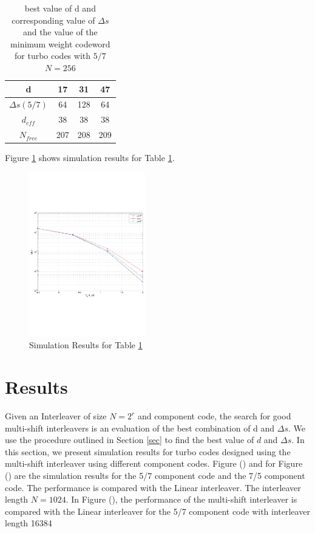 \documentclass[twocolumn]{article}
\begin{document}
 \begin{table}[h!]
\centering
\begin{tabular}{||c |c |c |c||} 
 \hline
 d & 17 & 31 & 47 \\ [0.5ex] 
 \hline\hline
 $\Delta s(5/7)$ & 64 & 128 & 64 \\ 
 \hline
  $d_{eff}$ & 38 & 38 & 38 \\ 
  \hline
  $N_{free}$ & 207 & 208 & 209 \\ [1ex] 
 \hline
\end{tabular}
\caption{best value of d and corresponding value of $\Delta s$ 
and the value of the minimum weight codeword for
 turbo codes with $5/7$ $N=256$}
\label{tab1}
\end{table}

 Figure \ref{comp1} shows simulation results for Table 
 \ref{tab1}.
\begin{figure}[h!]
\centering
		\includegraphics[height = 10 cm,width=0.45\textwidth]{myInterleaver_(comparison_256)_5_7_2.pdf}
		\caption{Simulation Results for Table \ref{tab1}}
		\label{comp1}
		\end{figure}
		
\section{Results}
Given an Interleaver of size $N=2^r$ and component code, the search for good
multi-shift interleavers is an evaluation of the best combination of d and $\Delta s$.
 We  use the procedure outlined in Section \ref{sec}
to find the best value of $d$ and $\Delta s$. In this section, we present simulation 
results
for turbo codes designed using the multi-shift interleaver using different component
codes.
 Figure () and for  Figure () are the simulation results for the 5/7 component code
 and the 7/5 component code. The performance is compared with the Linear interleaver.
The interleaver length $N=1024$. In Figure (), the performance of the multi-shift 
interleaver is compared with the Linear interleaver  for the 
5/7 component code with interleaver length 16384
\end{document}
